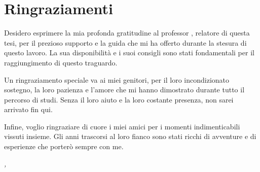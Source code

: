 \chapter*{Ringraziamenti}
\noindent Desidero esprimere la mia profonda gratitudine al professor \myProf, relatore di questa tesi, per il prezioso supporto e la guida che mi ha offerto durante la stesura di questo lavoro. La sua disponibilità e i suoi consigli sono stati fondamentali per il raggiungimento di questo traguardo.

\noindent Un ringraziamento speciale va ai miei genitori, per il loro incondizionato sostegno, la loro pazienza e l'amore che mi hanno dimostrato durante tutto il percorso di studi. Senza il loro aiuto e la loro costante presenza, non sarei arrivato fin qui.

\noindent Infine, voglio ringraziare di cuore i miei amici per i momenti indimenticabili vissuti insieme. Gli anni trascorsi al loro fianco sono stati ricchi di avventure e di esperienze che porterò sempre con me.
\bigskip

\noindent\textit{\myLocation, \myTime}
\hfill \myName

\endgroup
